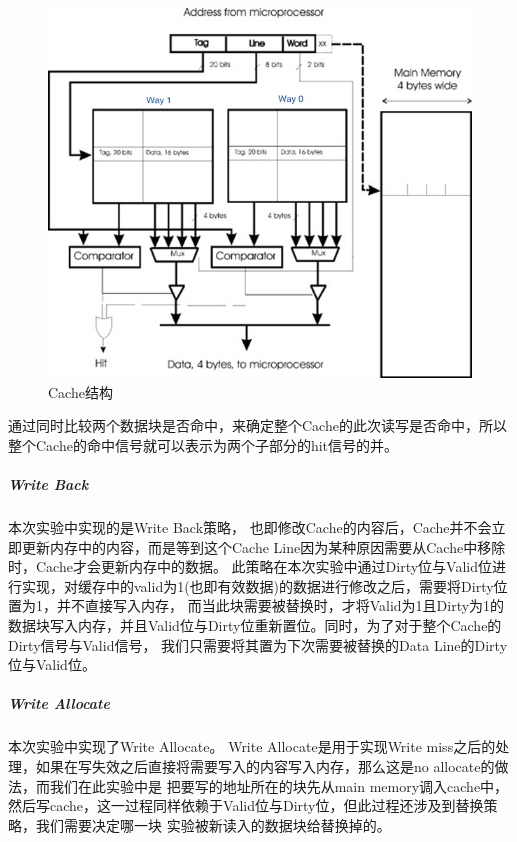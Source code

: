 \begin{figure}[H] %
    \centering %
    \includegraphics[width=1.0\textwidth]{figs/CacheStruct.png} %
    \caption{Cache结构} %
    \label{Fig.1} %
\end{figure}

通过同时比较两个数据块是否命中，来确定整个Cache的此次读写是否命中，所以整个Cache的命中信号就可以表示为两个子部分的hit信号的并。

\subparagraph{Write Back} 本次实验中实现的是Write Back策略，
也即修改Cache的内容后，Cache并不会立即更新内存中的内容，而是等到这个Cache Line因为某种原因需要从Cache中移除时，Cache才会更新内存中的数据。
此策略在本次实验中通过Dirty位与Valid位进行实现，对缓存中的valid为1(也即有效数据)的数据进行修改之后，需要将Dirty位置为1，并不直接写入内存，
而当此块需要被替换时，才将Valid为1且Dirty为1的数据块写入内存，并且Valid位与Dirty位重新置位。同时，为了对于整个Cache的Dirty信号与Valid信号，
我们只需要将其置为下次需要被替换的Data Line的Dirty位与Valid位。

\subparagraph{Write Allocate} 本次实验中实现了Write Allocate。
Write Allocate是用于实现Write miss之后的处理，如果在写失效之后直接将需要写入的内容写入内存，那么这是no allocate的做法，而我们在此实验中是
把要写的地址所在的块先从main memory调入cache中，然后写cache，这一过程同样依赖于Valid位与Dirty位，但此过程还涉及到替换策略，我们需要决定哪一块
实验被新读入的数据块给替换掉的。

